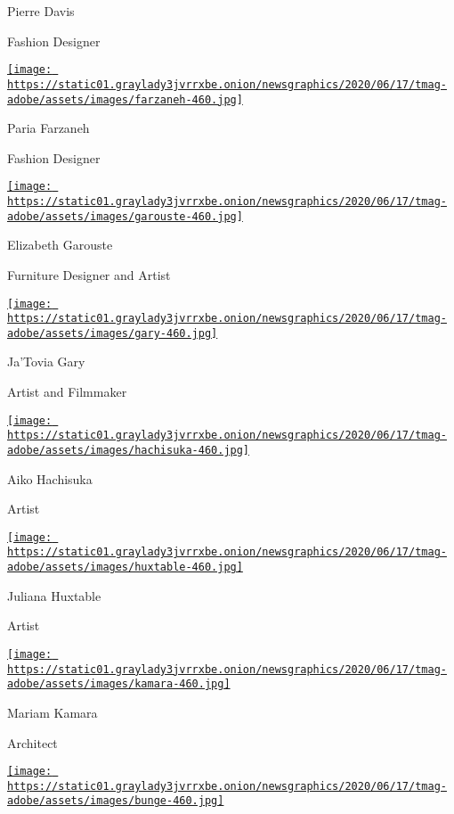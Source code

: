 Pierre Davis

Fashion Designer

\href{https://www.nytimes3xbfgragh.onion/2020/08/10/t-magazine/paria-farzaneh-fashion-menswear.html}{\texttt{[image: https://static01.graylady3jvrrxbe.onion/newsgraphics/2020/06/17/tmag-adobe/assets/images/farzaneh-460.jpg]}}

Paria Farzaneh

Fashion Designer

\href{https://www.nytimes3xbfgragh.onion/2020/08/10/t-magazine/elizabeth-garouste-interior-design.html}{\texttt{[image: https://static01.graylady3jvrrxbe.onion/newsgraphics/2020/06/17/tmag-adobe/assets/images/garouste-460.jpg]}}

Elizabeth Garouste

Furniture Designer and Artist

\href{https://www.nytimes3xbfgragh.onion/2020/08/10/t-magazine/jatovia-gary-film.html}{\texttt{[image: https://static01.graylady3jvrrxbe.onion/newsgraphics/2020/06/17/tmag-adobe/assets/images/gary-460.jpg]}}

Ja'Tovia Gary

Artist and Filmmaker

\href{https://www.nytimes3xbfgragh.onion/2020/08/10/t-magazine/aiko-hachisuka-art-sculpture.html}{\texttt{[image: https://static01.graylady3jvrrxbe.onion/newsgraphics/2020/06/17/tmag-adobe/assets/images/hachisuka-460.jpg]}}

Aiko Hachisuka

Artist

\href{https://www.nytimes3xbfgragh.onion/2020/08/10/t-magazine/juliana-huxtable.html}{\texttt{[image: https://static01.graylady3jvrrxbe.onion/newsgraphics/2020/06/17/tmag-adobe/assets/images/huxtable-460.jpg]}}

Juliana Huxtable

Artist

\href{https://www.nytimes3xbfgragh.onion/2020/08/10/t-magazine/mariam-kamara-architect-design.html}{\texttt{[image: https://static01.graylady3jvrrxbe.onion/newsgraphics/2020/06/17/tmag-adobe/assets/images/kamara-460.jpg]}}

Mariam Kamara

Architect

\href{https://www.nytimes3xbfgragh.onion/2020/08/10/t-magazine/sophia-moreno-bunge-floral-design.html}{\texttt{[image: https://static01.graylady3jvrrxbe.onion/newsgraphics/2020/06/17/tmag-adobe/assets/images/bunge-460.jpg]}}

